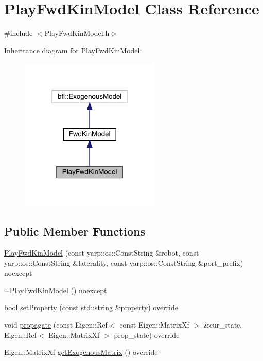 \hypertarget{classPlayFwdKinModel}{}\section{Play\+Fwd\+Kin\+Model Class Reference}
\label{classPlayFwdKinModel}


{\ttfamily \#include $<$Play\+Fwd\+Kin\+Model.\+h$>$}



Inheritance diagram for Play\+Fwd\+Kin\+Model\+:
\nopagebreak
\begin{figure}[H]
\begin{center}
\leavevmode
\includegraphics[width=189pt]{classPlayFwdKinModel__inherit__graph}
\end{center}
\end{figure}
\subsection*{Public Member Functions}
\begin{DoxyCompactItemize}
\item 
\hyperlink{classPlayFwdKinModel_aa7dbbe09aed1e7d1a1ac3fc37807f57c}{Play\+Fwd\+Kin\+Model} (const yarp\+::os\+::\+Const\+String \&robot, const yarp\+::os\+::\+Const\+String \&laterality, const yarp\+::os\+::\+Const\+String \&port\+\_\+prefix) noexcept
\item 
\hyperlink{classPlayFwdKinModel_a0af36404764e109bedacd8648939ba9c}{$\sim$\+Play\+Fwd\+Kin\+Model} () noexcept
\item 
bool \hyperlink{classPlayFwdKinModel_ae7f9432ed4f7069442821dbfa598321d}{set\+Property} (const std\+::string \&property) override
\item 
void \hyperlink{classFwdKinModel_a9461ff14a1ae8d05169e8f1c7a6237c7}{propagate} (const Eigen\+::\+Ref$<$ const Eigen\+::\+Matrix\+Xf $>$ \&cur\+\_\+state, Eigen\+::\+Ref$<$ Eigen\+::\+Matrix\+Xf $>$ prop\+\_\+state) override
\item 
Eigen\+::\+Matrix\+Xf \hyperlink{classFwdKinModel_ac8ed4e8a52f5ff33cc158c80c6cf083e}{get\+Exogenous\+Matrix} () override
\end{DoxyCompactItemize}
